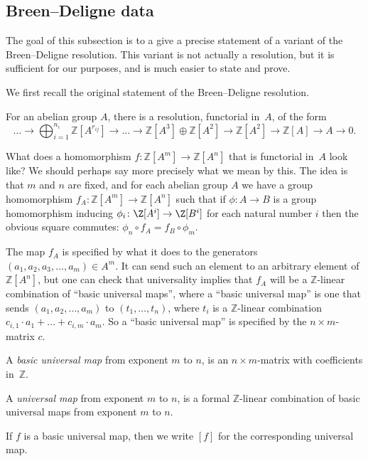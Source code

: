 \subsection{Breen--Deligne data}

The goal of this subsection is to a give a precise statement of
a variant of the Breen--Deligne resolution.
This variant is not actually a resolution,
but it is sufficient for our purposes,
and is much easier to state and prove.

We first recall the original statement of the Breen--Deligne resolution.
\begin{theoremx}
  \label{BD_orig}
  For an abelian group $A$, there is a resolution, functorial in~$A$, of the form
  \[
    \ldots \to \bigoplus_{i=1}^{n_i} \mathbb Z[A^{r_{ij}}] \to \ldots
    \to \mathbb Z[A^3] \oplus \mathbb Z[A^2] \to \mathbb Z[A^2] \to \mathbb Z[A] \to A \to 0.
  \]
\end{theoremx}

What does a homomorphism $f \colon \mathbb Z[A^m] \to \mathbb Z[A^n]$
that is functorial in~$A$ look like?
We should perhaps say more precisely what we mean by this.
The idea is that $m$ and $n$ are fixed,
and for each abelian group $A$ we have a group homomorphism
$f_A\colon \mathbb Z[A^m] \to \mathbb Z[A^n]$ 
such that if $\phi \colon A\to B$ is a group homomorphism
inducing $\phi_i \colon\Z[A^i]\to\Z[B^i]$ for each natural number $i$
then the obvious square commutes: $\phi_n \circ f_A = f_B \circ \phi_m$.

The map $f_A$ is specified by what it does to the generators
$(a_1, a_2, a_3, \dots, a_m)\in A^m$.
It can send such an element to an arbitrary element of $\mathbb Z[A^n]$,
but one can check that universality implies that $f_A$
will be a $\mathbb Z$-linear combination of ``basic universal maps'',
where a ``basic universal map'' is one that sends $(a_1, a_2, \dots, a_m)$ to $(t_1, \dots, t_n)$,
where $t_i$ is a $\mathbb Z$-linear combination $c_{i,1} \cdot a_1 + \dots + c_{i,m} \cdot a_m$.
So a ``basic universal map'' is specified by the $n \times m$-matrix $c$.

\begin{definition}
  \label{basic_universal_map}
  \leanok
  A \emph{basic universal map} from exponent $m$ to $n$,
  is an $n \times m$-matrix with coefficients in~$\mathbb Z$.
\end{definition}

\begin{definition}
  \label{universal_map}
  \leanok
  A \emph{universal map} from exponent $m$ to $n$,
  is a formal $\mathbb Z$-linear combination
  of basic universal maps from exponent $m$ to $n$.

  If $f$ is a basic universal map,
  then we write $[f]$ for the corresponding universal map.
\end{definition}

